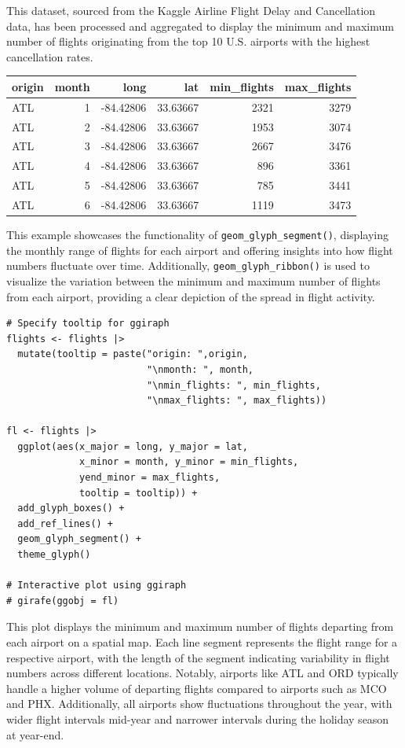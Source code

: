 This dataset, sourced from the Kaggle Airline Flight Delay and Cancellation data, has been processed and aggregated to display the minimum and maximum number of flights originating from the top 10 U.S. airports with the highest cancellation rates.

\begin{table}
\centering
\begin{tabular}{l|r|r|r|r|r}
\hline
origin & month & long & lat & min\_flights & max\_flights\\
\hline
ATL & 1 & -84.42806 & 33.63667 & 2321 & 3279\\
\hline
ATL & 2 & -84.42806 & 33.63667 & 1953 & 3074\\
\hline
ATL & 3 & -84.42806 & 33.63667 & 2667 & 3476\\
\hline
ATL & 4 & -84.42806 & 33.63667 & 896 & 3361\\
\hline
ATL & 5 & -84.42806 & 33.63667 & 785 & 3441\\
\hline
ATL & 6 & -84.42806 & 33.63667 & 1119 & 3473\\
\hline
\end{tabular}
\end{table}

This example showcases the functionality of \texttt{geom\_glyph\_segment()}, displaying the monthly range of flights for each airport and offering insights into how flight numbers fluctuate over time. Additionally, \texttt{geom\_glyph\_ribbon()} is used to visualize the variation between the minimum and maximum number of flights from each airport, providing a clear depiction of the spread in flight activity.

\begin{verbatim}
# Specify tooltip for ggiraph 
flights <- flights |>
  mutate(tooltip = paste("origin: ",origin,
                         "\nmonth: ", month,
                         "\nmin_flights: ", min_flights,
                         "\nmax_flights: ", max_flights))

fl <- flights |> 
  ggplot(aes(x_major = long, y_major = lat,
             x_minor = month, y_minor = min_flights,
             yend_minor = max_flights,
             tooltip = tooltip)) + 
  add_glyph_boxes() +
  add_ref_lines() +
  geom_glyph_segment() +
  theme_glyph()

# Interactive plot using ggiraph
# girafe(ggobj = fl)
\end{verbatim}

This plot displays the minimum and maximum number of flights departing from each airport on a spatial map. Each line segment represents the flight range for a respective airport, with the length of the segment indicating variability in flight numbers across different locations. Notably, airports like ATL and ORD typically handle a higher volume of departing flights compared to airports such as MCO and PHX. Additionally, all airports show fluctuations throughout the year, with wider flight intervals mid-year and narrower intervals during the holiday season at year-end.

